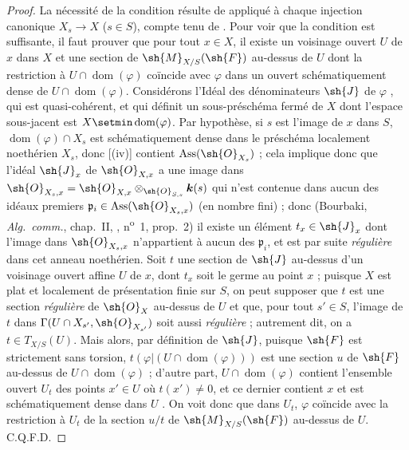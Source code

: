 \begin{proof}
La nécessité de la condition résulte de  appliqué à chaque injection canonique $X_s\to X$ ($s\in S$), compte tenu de .
Pour voir que la condition est suffisante, il faut prouver que pour tout $x\in X$, il existe un voisinage ouvert $U$ de $x$ dans $X$ et une section de $\sh{M}_{X/S}(\sh{F})$ au-dessus de $U$ dont la restriction à $U\cap\operatorname{dom}(\varphi)$ coïncide avec $\varphi$ dans un ouvert schématiquement dense de $U\cap\operatorname{dom}(\varphi)$.
Considérons l'Idéal des dénominateurs $\sh{J}$ de $\varphi$ , qui est quasi-cohérent, et qui définit un sous-préschéma fermé de $X$ dont l'espace sous-jacent est $X\setmin\operatorname{dom}(\varphi)$.
Par hypothèse, si $s$ est l'image de $x$ dans $S$, $\operatorname{dom}(\varphi)\cap X_s$ est schématiquement dense dans le préschéma localement noethérien $X_s$, donc [(iv)] contient $\operatorname{Ass}(\sh{O}_{X_s})$ ; cela implique donc que l'idéal $\sh{J}_x$ de $\sh{O}_{X,x}$ a une image dans $\sh{O}_{X_s,x}=\sh{O}_{X,x}\otimes_{\sh{O}_{S,s}}\boldsymbol{k}(s)$ qui n'est contenue dans aucun des idéaux premiers $\mathfrak{p}_i\in\operatorname{Ass}(\sh{O}_{X_s,x})$ (en nombre fini) ; donc (Bourbaki, \emph{Alg.~comm.}, chap.~II, , n\textsuperscript{o}~1, prop.~2) il existe un élément $t_x\in\sh{J}_x$ dont l'image dans $\sh{O}_{X_s,x}$ n'appartient à aucun des $\mathfrak{p}_i$, et est par suite \emph{régulière} dans cet anneau noethérien.
Soit $t$ une section de $\sh{J}$ au-dessus d'un voisinage ouvert affine $U$ de $x$, dont $t_x$ soit le germe au point $x$ ; puisque $X$ est plat et localement de présentation finie sur $S$, on peut supposer  que $t$ est une section \emph{régulière} de $\sh{O}_X$ au-dessus de $U$ et que, pour tout $s'\in S$, l'image de $t$ dans $\Gamma(U\cap X_{s'},\sh{O}_{X_{s'}})$ soit aussi \emph{régulière} ; autrement dit, on a $t\in T_{X/S}(U)$.
Mais alors, par définition de $\sh{J}$, puisque $\sh{F}$ est strictement sans torsion, $t(\varphi|(U\cap\operatorname{dom}(\varphi)))$ est une section $u$ de $\sh{F}$ au-dessus de $U\cap\operatorname{dom}(\varphi)$ ; d'autre part, $U\cap\operatorname{dom}(\varphi)$ contient l'ensemble ouvert $U_t$ des points $x'\in U$ où $t(x')\neq0$, et ce dernier contient $x$ et est schématiquement dense dans $U$ .
On voit donc que dans $U_t$, $\varphi$ coïncide avec la restriction à $U_t$ de la section $u/t$ de $\sh{M}_{X/S}(\sh{F})$ au-dessus de $U$.
C.Q.F.D.
\end{proof}

